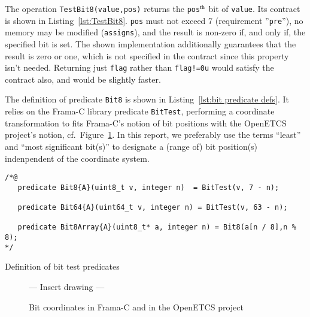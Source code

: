 The operation \lstinline{TestBit8(value,pos)} returns the
\lstinline{pos}$^{\mbox{\scriptsize th}}$
bit of \lstinline{value}.
%
Its contract is shown in Listing~\ref{lst:TestBit8}.
%
\lstinline{pos} must not exceed 7 (requirement ''\lstinline{pre}''),
no memory may be modified (\lstinline{assigns}), and the result is non-zero if, and only
if, the specified bit is set.
%
The shown implementation additionally guarantees that the result is zero or one, which
is not specified in the contract since this property isn't needed.
%
Returning just \lstinline{flag} rather than \lstinline{flag!=0u} would satisfy the
contract also, and would be slightly faster.

The definition of predicate \lstinline{Bit8} is shown in 
Listing~\ref{lst:bit predicate defs}.
%
It relies on the Frama-C library predicate \lstinline{BitTest}, performing a coordinate
transformation to fits Frama-C's notion of bit positions with the OpenETCS project's
notion, cf.\ Figure~\ref{fig:bit coords}.
%
In this report, we preferably use the terms ``least'' and ``most significant bit(s)'' to
designate a (range of) bit position(s) indenpendent of the coordinate system.






\begin{listing}[hbt]
\begin{minipage}{0.99\textwidth}
\begin{lstlisting}[style=acsl-block]
/*@
   predicate Bit8{A}(uint8_t v, integer n)  = BitTest(v, 7 - n);

   predicate Bit64{A}(uint64_t v, integer n) = BitTest(v, 63 - n);

   predicate Bit8Array{A}(uint8_t* a, integer n) = Bit8(a[n / 8],n % 8);
*/
\end{lstlisting}
\end{minipage}
\caption{\label{lst:bit predicate defs}Definition of bit test predicates}
\end{listing}








\begin{figure}
\begin{center}
\vspace*{2cm}
--- Insert drawing --- 
\vspace*{2cm}
\caption{\label{fig:bit coords}
        Bit coordinates in Frama-C and in the OpenETCS project}
\end{center}
\end{figure}






